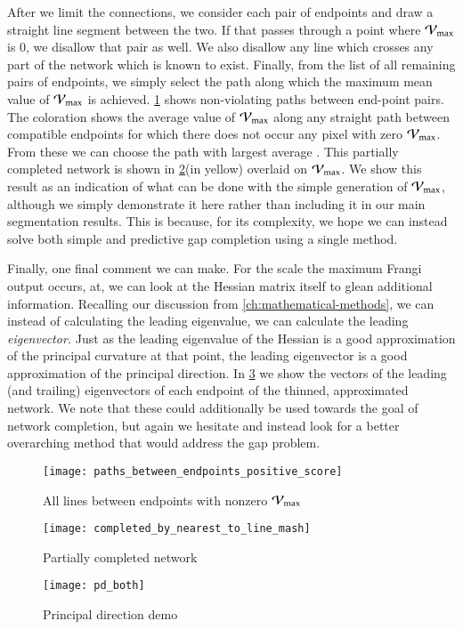 After we limit the connections, we consider each pair of endpoints and draw a straight line segment between the two. If that passes through a point where $\mathcal{V}_{\max}$ is 0, we disallow that pair as well. We also disallow any line which crosses any part of the network which is known to exist.
Finally, from the list of all remaining pairs of endpoints, we simply select the path along which the maximum mean value of $\mathcal{V}_{\max}$ is achieved. \cref{fig:network-completion-connected-pairs} shows non-violating paths between end-point pairs. The coloration shows the average value of $\mathcal{V}_{\max}$ along any straight path between compatible endpoints for which there does not occur any pixel with zero $\mathcal{V}_{\max}$. From these we can choose the path with largest average \Vmax. This partially completed network is shown in  \cref{fig:network-completion-end-result}(in yellow) overlaid on $\mathcal{V}_{\max}$.
We show this result as an indication of what can be done with the simple generation of $\mathcal{V}_{\max}$, although we simply demonstrate it here rather than including it in our main segmentation results. This is because, for its complexity, we hope we can instead solve both simple and predictive gap completion using a single method.

Finally, one final comment we can make. For the scale the maximum Frangi output occurs, at, we can look at the Hessian matrix itself to glean additional information. Recalling our discussion from \cref{ch:mathematical-methods}, we can instead of calculating the leading eigenvalue, we can calculate the leading \textit{eigenvector.} Just as the leading eigenvalue of the Hessian is a good approximation of the principal curvature at that point, the leading eigenvector is a good approximation of the principal direction. In \cref{fig:pd_demo} we show the vectors of the leading (and trailing) eigenvectors of each endpoint of the thinned, approximated network. We note that these could additionally be used towards the goal of network completion, but again we hesitate and instead look for a better overarching method that would address the gap problem.

\begin{figure}
	\texttt{[image: paths\_between\_endpoints\_positive\_score]}
	\caption{All lines between endpoints with nonzero $\mathcal{V}_{\max}$}
	\label{fig:network-completion-connected-pairs}
\end{figure}
\begin{figure}
	\texttt{[image: completed\_by\_nearest\_to\_line\_mash]}
	\caption{Partially completed network}
	\label{fig:network-completion-end-result}
\end{figure}

\begin{figure}
	\texttt{[image: pd\_both]}
	\caption{Principal direction demo}
	\label{fig:pd_demo}
\end{figure}

